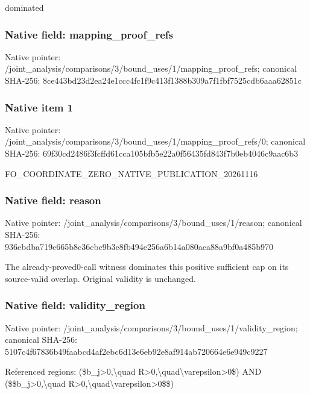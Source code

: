 \documentclass[10pt,a4paper]{article}
\begin{document}
\begingroup\raggedright\sloppy dominated\par\endgroup

\subsubsection{Native field: mapping\_\allowbreak{}proof\_\allowbreak{}refs}
Native pointer: /joint\_\allowbreak{}analysis/comparisons/3/bound\_\allowbreak{}uses/1/mapping\_\allowbreak{}proof\_\allowbreak{}refs; canonical SHA-256: 8ce443bd23d2ea24e1ccc4fc1f9c413f1388b309a7f1fbf7525cdb6aaa62851c

\subsubsection{Native item 1}
Native pointer: /joint\_\allowbreak{}analysis/comparisons/3/bound\_\allowbreak{}uses/1/mapping\_\allowbreak{}proof\_\allowbreak{}refs/0; canonical SHA-256: 69f30cd2486f3fcffd61cca105bfb5e22a0f56435fd843f7b0eb4046c9aac6b3

\begingroup\raggedright\sloppy FO\_\allowbreak{}COORDINATE\_\allowbreak{}ZERO\_\allowbreak{}NATIVE\_\allowbreak{}PUBLICATION\_\allowbreak{}20261116\par\endgroup

\subsubsection{Native field: reason}
Native pointer: /joint\_\allowbreak{}analysis/comparisons/3/bound\_\allowbreak{}uses/1/reason; canonical SHA-256: 936ebdba719c665b8c36cbc9b3e8fb494e256a6b14a080aca88a9bf0a485b970

\begingroup\raggedright\sloppy The already-proved0-call witness dominates this positive sufficient cap on its source-valid overlap. Original validity is unchanged.\par\endgroup

\subsubsection{Native field: validity\_\allowbreak{}region}
Native pointer: /joint\_\allowbreak{}analysis/comparisons/3/bound\_\allowbreak{}uses/1/validity\_\allowbreak{}region; canonical SHA-256: 5107c4f67836b49faabcd4af2ebc6d13e6eb92e8af914ab720664e6e949c9227

\begingroup\raggedright\sloppy Referenced regions:\allowbreak{} (\$b\_\allowbreak{}j>0,\allowbreak{}\textbackslash{}quad R>0,\allowbreak{}\textbackslash{}quad\textbackslash{}varepsilon>0\$) AND (\$\$b\_\allowbreak{}j>0,\allowbreak{}\textbackslash{}quad R>0,\allowbreak{}\textbackslash{}quad\textbackslash{}varepsilon>0\$\$)\par\endgroup
\end{document}
